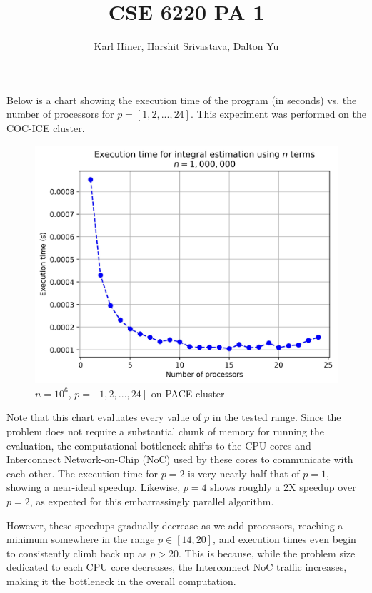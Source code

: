 \documentclass{article}
\begin{document}
\title{CSE 6220 PA 1}
\author{Karl Hiner, Harshit Srivastava, Dalton Yu}
\maketitle

Below is a chart showing the execution time of the program (in seconds) vs. the number of processors for $p = [1,2,..., 24]$.
This experiment was performed on the COC-ICE cluster.

\begin{figure}[htb]
    \centering \includegraphics[scale = 0.75]{report_chart_n_1M_PACE.jpg}
    \caption{$n=10^6$, $p=[1,2,...,24]$ on PACE cluster}
    \label{fig:figure1}
\end{figure}

Note that this chart evaluates every value of $p$ in the tested range.
Since the problem does not require a substantial chunk of memory for running the evaluation, the computational bottleneck shifts to the CPU cores and Interconnect Network-on-Chip (NoC) used by these cores to communicate with each other. The execution time for $p = 2$ is very nearly half that of $p = 1$, showing a near-ideal speedup. Likewise, $p = 4$ shows roughly a 2X speedup over $p = 2$, as expected for this embarrassingly parallel algorithm.

However, these speedups gradually decrease as we add processors, reaching a minimum somewhere in the range $p \in [14, 20]$, and execution times even begin to consistently climb back up as $p > 20$.
This is because, while the problem size dedicated to each CPU core decreases, the Interconnect NoC traffic increases, making it the bottleneck in the overall computation.
\end{document}
